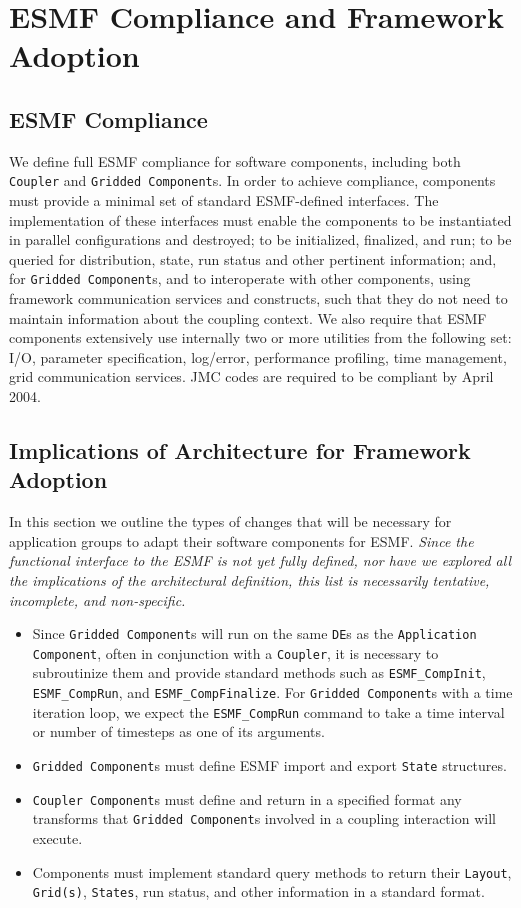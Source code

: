\section{ESMF Compliance and Framework Adoption}
\label{sec:implications}

\subsection{ESMF Compliance}

We define full ESMF compliance for software components, including
both {\tt Coupler} and {\tt Gridded Component}s.  In order to 
achieve compliance, 
components must provide a minimal set of standard ESMF-defined 
interfaces.  The implementation of these interfaces must enable the  
components to be instantiated in parallel configurations
and destroyed; to be initialized, finalized, and run; to be queried for 
distribution, state, run status and other pertinent information;
and, for {\tt Gridded Component}s, and to interoperate with other components,
using framework communication services and constructs, such
that they do not need to maintain information about the coupling context.
We also require that ESMF components extensively use internally two 
or more utilities from the following set: I/O, parameter specification, 
log/error, performance profiling, time management, grid communication 
services.  JMC codes are required to be compliant by April 2004.

\subsection{Implications of Architecture for Framework Adoption}

In this section we outline the types of changes that will be necessary for
application groups to adapt their software components for ESMF.  {\it Since the
functional interface to the ESMF is not yet fully defined, nor have we 
explored all the implications of the architectural definition, this list is 
necessarily tentative, incomplete, and non-specific.}

\begin{itemize}
\item Since {\tt Gridded Component}s will run on the same 
{\tt DE}s as the {\tt Application Component}, often in conjunction 
with a {\tt Coupler}, 
it is necessary to subroutinize
them and provide standard methods such as {\tt ESMF\_CompInit}, 
{\tt ESMF\_CompRun}, and {\tt ESMF\_CompFinalize}.  For {\tt Gridded 
Component}s
with a time iteration loop, we expect the {\tt ESMF\_CompRun} command to 
take a time interval or number of timesteps as one of its arguments.
\item {\tt Gridded Component}s must define ESMF import and export {\tt State} 
structures.
\item {\tt Coupler Component}s must define and return in a specified 
format any transforms that {\tt Gridded Component}s involved 
in a coupling interaction will execute.
\item Components must implement standard query methods to return
their {\tt Layout}, {\tt Grid(s)}, {\tt States}, run status, and other 
information in a standard format.
\end{itemize}

